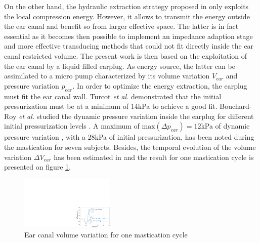 \documentclass[3p,twocolumn,preprint]{elsarticle}
\begin{document}
On the other hand, the hydraulic extraction strategy proposed in \cite{Delnavaz2012} only exploits the local compression energy. However, it allows to transmit the energy outside the ear canal and benefit so from larger effective space. The latter is in fact essential as it becomes then possible to implement an impedance adaption stage and more effective transducing methods that could not fit directly inside the ear canal restricted volume. The present work is then based on the exploitation of the ear canal by a liquid filled earplug. As energy source, the latter can be assimilated to a micro pump characterized by its volume variation $V_{ear}$ and pressure variation $p_{ear}$. In order to optimize the energy extraction, the earplug must fit the ear canal wall. Turcot \emph{et al.} demonstrated that the initial pressurization must be at a minimum of 14kPa to achieve a good fit. Bouchard-Roy \emph{et al.} studied the dynamic pressure variation inside the earplug for different initial pressurization levels \cite{Bouchard-Roy2020}. A maximum of $\text{max}(\Delta p_{ear})=12$kPa of dynamic pressure variation , with a $28$kPa of initial pressurization, has been noted during the mastication for seven subjects. Besides, the temporal evolution of the volume variation $\Delta V_{ear}$ has been estimated in \cite{Delnavaz2012} and the result for one mastication cycle is presented on figure \ref{fig:deltaV_ear}.
\begin{figure}[!htbp]
	\centering
	\captionsetup{justification=centering}
	\includegraphics[trim={20.5cm 0cm 0cm 10.8cm},clip, width=0.4\textwidth]{figures/deltaV_ear.pdf}
	\caption{Ear canal volume variation for one mastication cycle \cite{Delnavaz2012}}
	\label{fig:deltaV_ear}
\end{figure}
\end{document}
